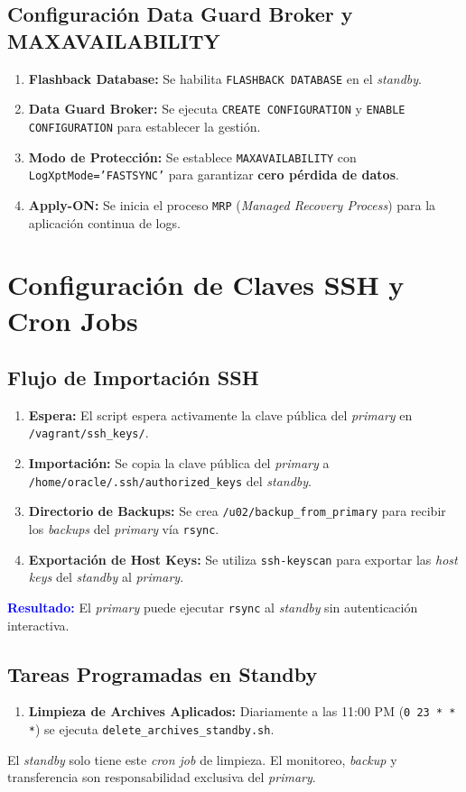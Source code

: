 \documentclass[11pt, a4paper]{report}
\newcommand{\destacado}[1]{\textbf{\textcolor{blue}{#1}}}
\begin{document}
\subsection{Configuración Data Guard Broker y MAXAVAILABILITY}
\begin{enumerate}
    \item \textbf{Flashback Database:} Se habilita \texttt{FLASHBACK DATABASE} en el \textit{standby}.
\item \textbf{Data Guard Broker:} Se ejecuta \texttt{CREATE CONFIGURATION} y \texttt{ENABLE CONFIGURATION} para establecer la gestión.
\item \textbf{Modo de Protección:} Se establece \texttt{MAXAVAILABILITY} con \texttt{LogXptMode='FASTSYNC'} para garantizar \textbf{cero pérdida de datos}.
\item \textbf{Apply-ON:} Se inicia el proceso \texttt{MRP} (\textit{Managed Recovery Process}) para la aplicación continua de logs.
\end{enumerate}

\section{Configuración de Claves SSH y Cron Jobs}

\subsection{Flujo de Importación SSH}
\begin{enumerate}
    \item \textbf{Espera:} El script espera activamente la clave pública del \textit{primary} en \texttt{/vagrant/ssh\_keys/}.
\item \textbf{Importación:} Se copia la clave pública del \textit{primary} a \texttt{/home/oracle/.ssh/authorized\_keys} del \textit{standby}.
\item \textbf{Directorio de Backups:} Se crea \texttt{/u02/backup\_from\_primary} para recibir los \textit{backups} del \textit{primary} vía \texttt{rsync}.
\item \textbf{Exportación de Host Keys:} Se utiliza \texttt{ssh-keyscan} para exportar las \textit{host keys} del \textit{standby} al \textit{primary}.
\end{enumerate}
\destacado{Resultado:} El \textit{primary} puede ejecutar \texttt{rsync} al \textit{standby} sin autenticación interactiva.
\subsection{Tareas Programadas en Standby}
\begin{enumerate}
    \item \textbf{Limpieza de Archives Aplicados:} Diariamente a las 11:00 PM (\texttt{0 23 * * *}) se ejecuta \texttt{delete\_archives\_standby.sh}.
\end{enumerate}
El \textit{standby} solo tiene este \textit{cron job} de limpieza. El monitoreo, \textit{backup} y transferencia son responsabilidad exclusiva del \textit{primary}.
\end{document}

